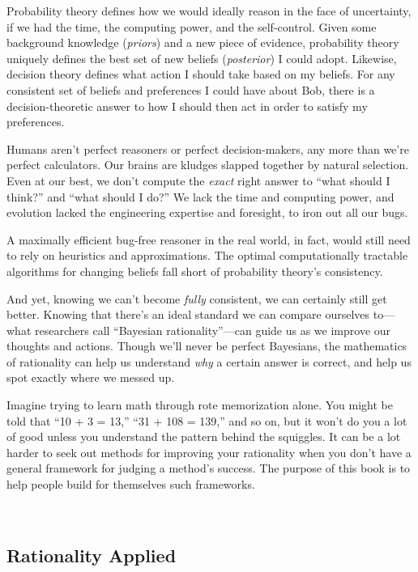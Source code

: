 {
 Probability theory defines how we would ideally reason in the face
of uncertainty, if we had the time, the computing power, and the
self-control. Given some background knowledge (\textit{priors}) and a
new piece of evidence, probability theory uniquely defines the best set
of new beliefs (\textit{posterior}) I could adopt. Likewise, decision
theory defines what action I should take based on my beliefs. For any
consistent set of beliefs and preferences I could have about Bob, there
is a decision-theoretic answer to how I should then act in order to
satisfy my preferences.}

{
 Humans aren't perfect reasoners or perfect
decision-makers, any more than we're perfect
calculators. Our brains are kludges slapped together by natural
selection. Even at our best, we don't compute the
\textit{exact} right answer to ``what should I
think?'' and ``what should I
do?'' We lack the time and computing power, and
evolution lacked the engineering expertise and foresight, to iron out
all our bugs.}

{
 A maximally efficient bug-free reasoner in the real world, in
fact, would still need to rely on heuristics and approximations. The
optimal computationally tractable algorithms for changing beliefs fall
short of probability theory's consistency.}

{
 And yet, knowing we can't become \textit{fully}
consistent, we can certainly still get better. Knowing that
there's an ideal standard we can compare ourselves
to---what researchers call ``Bayesian
rationality''---can guide us as we improve our
thoughts and actions. Though we'll never be perfect
Bayesians, the mathematics of rationality can help us understand
\textit{why} a certain answer is correct, and help us spot exactly
where we messed up.}

{
 Imagine trying to learn math through rote memorization alone. You
might be told that ``10 + 3 = 13,''
``31 + 108 = 139,'' and so on, but
it won't do you a lot of good unless you understand the
pattern behind the squiggles. It can be a lot harder to seek out
methods for improving your rationality when you don't
have a general framework for judging a method's
success. The purpose of this book is to help people build for
themselves such frameworks.}

{
 ~}

\subsection{Rationality Applied}

